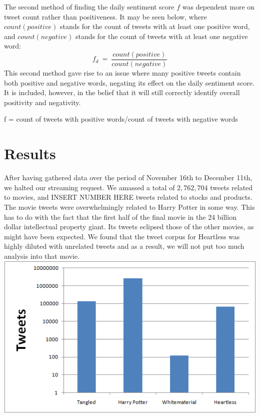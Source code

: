 \documentclass[11pt]{article}
\begin{document}
The second method of finding the daily sentiment score $f$ was dependent more on tweet count rather than positiveness. It may be seen below, where $count(positive)$ stands for the count of tweets with at least one positive word, and $count(negative)$ stands for the count of tweets with at least one negative word:
\begin{equation}
f_{d}\ =\ \frac{count(positive)}{count(negative)}
\end{equation}
This second method gave rise to an issue where many positive tweets contain both positive and negative words, negating its effect on the daily sentiment score. It is included, however, in the belief that it will still correctly identify overall positivity and negativity.

f = count of tweets with positive words/count of tweets with negative words

\section{Results}
After having gathered data over the period of November 16th to December 11th, we halted our streaming request. We amassed a total of $2,762,704$ tweets related to movies, and INSERT NUMBER HERE tweets related to stocks and products. The movie tweets were overwhelmingly related to Harry Potter in some way. This has to do with the fact that the first half of the final movie in the 24 billion dollar intellectual property giant. Its tweets eclipsed those of the other movies, as might have been expected. We found that the tweet corpus for Heartless was highly diluted with unrelated tweets and as a result, we will not put too much analysis into that movie.
\includegraphics[scale=.5]{img/PureTweets.png} 
\end{document}
